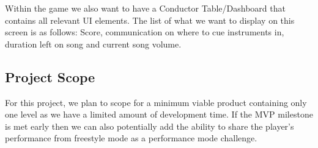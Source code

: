Within the game we also want to have a Conductor Table/Dashboard that contains all relevant UI elements. The list of what we want to display on this screen is as follows: Score, communication on where to cue instruments in, duration left on song and current song volume. 

\subsection{Project Scope} 
For this project, we plan to scope for a minimum viable product containing only one level as we have a limited amount of development time. If the MVP milestone is met early then we can also potentially add the ability to share the player’s performance from freestyle mode as a performance mode challenge. 

